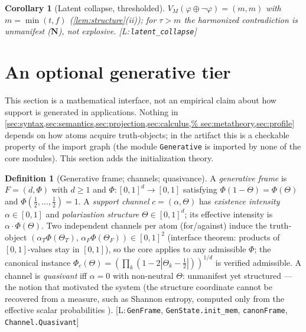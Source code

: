 \documentclass[11pt,a4paper]{article}
\newtheorem{corollary}[theorem]{Corollary}
\theoremstyle{definition}
\newtheorem{definition}[theorem]{Definition}
\newcommand{\vN}{\mathbf{N}}
\newcommand{\hmz}{\oplus}                       %
\newcommand{\lean}[1]{\texttt{#1}}
\begin{document}
\begin{corollary}[Latent collapse, thresholded]\label{cor:latent}
$V_M(\varphi\hmz\lnot\varphi)=(m,m)$ with $m=\min(t,f)$
(\cref{lem:structure}(ii)); for $\tau>m$ the harmonized contradiction is
unmanifest ($\vN$), not explosive. [L:\,\lean{latent\_collapse}]
\end{corollary}

\section{An optional generative tier}\label{sec:generative}

This section is a mathematical interface, not an empirical claim about how
support is generated in applications. Nothing in
\cref{sec:syntax,sec:semantics,sec:projection,sec:calculus,%
sec:metatheory,sec:profile} depends on how atoms acquire truth-objects; in
the artifact this is a checkable property of the import graph (the module
\lean{Generative} is imported by none of the core modules). This section
adds the initialization theory.

\begin{definition}[Generative frame; channels; quasivance]\label{def:genframe}
A \emph{generative frame} is $F=(d,\Phi)$ with $d\ge 1$ and
$\Phi:[0,1]^d\to[0,1]$ satisfying $\Phi(1{-}\Theta)=\Phi(\Theta)$ and
$\Phi(\tfrac12,\dots,\tfrac12)=1$. A \emph{support channel}
$c=(\alpha,\Theta)$ has \emph{existence intensity} $\alpha\in[0,1]$ and
\emph{polarization structure} $\Theta\in[0,1]^d$; its effective intensity
is $\alpha\cdot\Phi(\Theta)$. Two independent channels per atom
(for/against) induce the truth-object
$(\alpha_T\Phi(\Theta_T),\,\alpha_F\Phi(\Theta_F))\in[0,1]^2$ (interface
theorem: products of $[0,1]$-values stay in $[0,1]$), so the core applies
to any admissible $\Phi$; the canonical instance
$\Phi_c(\Theta)=(\prod_k(1-2|\Theta_k-\tfrac12|))^{1/d}$ is verified
admissible. A channel is \emph{quasivant} iff $\alpha=0$ with non-neutral
$\Theta$: unmanifest yet structured --- the notion that motivated the
system (the structure coordinate cannot be recovered from a measure, such as
Shannon entropy, computed only from the effective scalar probabilities
\cite{shannon1948mathematical}).
[L:\,\lean{GenFrame}, \lean{GenState.init\_mem}, \lean{canonFrame},
\lean{Channel.Quasivant}]
\end{definition}
\end{document}
